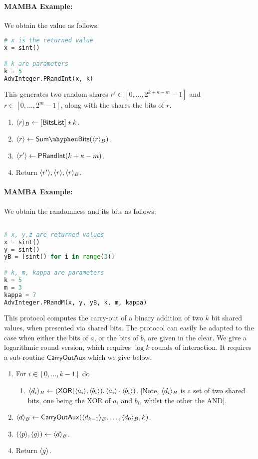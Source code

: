 \paragraph{MAMBA Example:}  We obtain the value as follows: 
\begin{lstlisting}[language={python}]
# x is the returned value
x = sint()

# k are parameters
k = 5
AdvInteger.PRandInt(x, k)
\end{lstlisting}

This generates two random shares $r' \in [0,\ldots,2^{k+\kappa-m}-1]$
and $r \in [0,\ldots,2^m-1]$, along with the shares the bits of $r$.
\begin{enumerate}
\item $\langle r \rangle_B \leftarrow [\mathsf{BitsList}]\star k$.
\item $\sshare{r} \asn \mathsf{Sum\mhyphen Bits}(\sshare{r}_B)$.
\item $\langle r' \rangle \leftarrow \mathsf{PRandInt}(k+\kappa-m)$.
\item Return $\langle r' \rangle, \langle r \rangle, \langle r \rangle_B$.
\end{enumerate}
\paragraph{MAMBA Example:}  We obtain the randomness and its bits as follows: 
\begin{lstlisting}[language={python}]

# x, y,z are returned values
x = sint()
y = sint()
yB = [sint() for i in range(3)]

# k, m, kappa are parameters
k = 5
m = 3
kappa = 7
AdvInteger.PRandM(x, y, yB, k, m, kappa)
\end{lstlisting}

This protocol computes the carry-out of a binary addition of
two $k$ bit shared values, when presented via shared bits.
The protocol can easily be adapted to the case when either
the bits of $a$, or the bits of $b$, are given in the clear.
We give a logarithmic round version, which requires $\log k$
rounds of interaction.
It requires a sub-routine $\mathsf{CarryOutAux}$ which we
give below.
\begin{enumerate}
\item For $i \in [0,\ldots,k-1]$ do
\begin{enumerate}
\item $\langle d_i \rangle_B \leftarrow (\mathsf{XOR}(\langle a_i \rangle,\langle b_i \rangle),
	                    \langle a_i \rangle\cdot \langle b_i \rangle)$.
      [Note, $\langle d_i \rangle_B$ is a set of two shared bits, one being the XOR
      of $a_i$ and $b_i$, whilst the other the AND].
\end{enumerate}
\item $\langle d \rangle_B \leftarrow \mathsf{CarryOutAux}(\langle d_{k-1} \rangle_B,\ldots,\langle d_0 \rangle_B,k)$.
\item $(\langle p \rangle,\langle g \rangle) \leftarrow \langle d \rangle_B$.
\item Return $\langle g \rangle$.
\end{enumerate}
